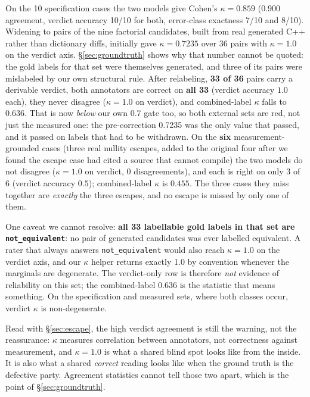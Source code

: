 \documentclass[10pt,twocolumn]{article}
\begin{document}
On the 10 specification cases the two models give Cohen's
$\kappa=\mathbf{0.859}$ (0.900 agreement, verdict accuracy 10/10 for both,
error-class exactness 7/10 and 8/10). Widening to pairs of the nine
factorial candidates, built from real generated C++ rather than dictionary diffs,
initially gave $\kappa=0.7235$ over 36 pairs with $\kappa=\mathbf{1.0}$ on the
verdict axis. \S\ref{sec:groundtruth} shows why that number cannot be quoted: the
gold labels for that set were themselves generated, and three of its pairs were
mislabeled by our own structural rule. After relabeling, \textbf{33 of 36} pairs
carry a derivable verdict, both annotators are correct on \textbf{all 33}
(verdict accuracy $\mathbf{1.0}$ each), they never disagree ($\kappa=1.0$ on
verdict), and combined-label $\kappa$ falls to $\mathbf{0.636}$. That is now
\emph{below} our own 0.7 gate too, so both external sets are red, not just the
measured one: the pre-correction 0.7235 was the only value that passed, and it
passed on labels that had to be withdrawn. On the
\textbf{six} measurement-grounded cases (three real nullity escapes, added to the
original four after we found the escape case had cited a source that cannot
compile) the two models do not disagree ($\kappa=1.0$ on verdict,
0 disagreements), and each is right on only 3 of 6 (verdict accuracy
$\mathbf{0.5}$); combined-label $\kappa$ is $\mathbf{0.455}$. The three cases they
miss together are \emph{exactly} the three escapes, and no escape is missed by only
one of them.

One caveat we cannot resolve: \textbf{all 33 labellable gold
labels in that set are \texttt{not\_equivalent}}: no pair of generated candidates
was ever labelled equivalent. A rater that always answers
\texttt{not\_equivalent} would also reach $\kappa=1.0$ on the verdict axis, and our
$\kappa$ helper returns exactly 1.0 by convention whenever the marginals are
degenerate. The verdict-only row is therefore \emph{not} evidence of reliability on
this set; the combined-label 0.636 is the statistic that means something. On the
specification and measured sets, where both classes occur, verdict $\kappa$ is
non-degenerate.

Read with \S\ref{sec:escape}, the high verdict agreement is still the warning, not
the reassurance: $\kappa$ measures correlation between annotators, not correctness
against measurement, and $\kappa=1.0$ is what a shared blind spot looks like from
the inside. It is also what a shared \emph{correct} reading looks like when the
ground truth is the defective party. Agreement statistics cannot tell those two
apart, which is the point of \S\ref{sec:groundtruth}.
\end{document}
